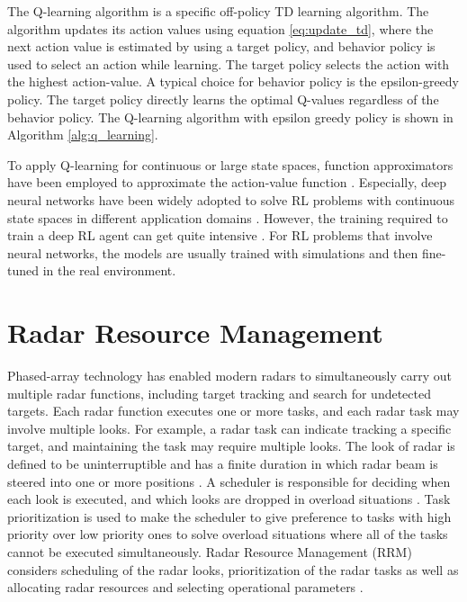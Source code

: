 \documentclass[english, 12pt, a4paper, elec, utf8, a-1b, online]{aaltothesis}
\begin{document}
The Q-learning algorithm is a specific off-policy TD learning algorithm. 
The algorithm updates its action values using equation \eqref{eq:update_td}, where the next action value is estimated by using a target policy, 
and behavior policy is used to select an action while learning. 
The target policy selects the action with the highest action-value.
A typical choice for behavior policy is the epsilon-greedy policy. 
The target policy directly learns the optimal Q-values regardless of the behavior policy. 
The Q-learning algorithm with epsilon greedy policy is shown in Algorithm \ref{alg:q_learning}.

To apply Q-learning for continuous or large state spaces, function approximators have been employed to approximate the action-value function \cite{Sutton2018}. 
Especially, deep neural networks have been widely adopted to solve RL problems with continuous state spaces in different application domains \cite{Mnih2013, Zhang2018, Luong2018}.
However, the training required to train a deep RL agent can get quite intensive \cite{Mnih2013}.
For RL problems that involve neural networks, the models are usually trained with simulations and then fine-tuned in the real environment.


\clearpage
\section{Radar Resource Management} \label{sec:existing_RRM}


Phased-array technology has enabled modern radars to simultaneously carry out multiple radar functions, including target tracking and search for undetected targets.
Each radar function executes one or more tasks, and each radar task may involve multiple looks.
For example, a radar task can indicate tracking a specific target, and maintaining the task may require multiple looks.
The look of radar is defined to be uninterruptible and has a finite duration in which radar beam is steered into one or more positions \cite{Moo2016}.
A scheduler is responsible for deciding when each look is executed, and which looks are dropped in overload situations \cite{Moo2016}. 
Task prioritization is used to make the scheduler to give preference to tasks with high priority over low priority ones to solve overload situations where all of the tasks cannot be executed simultaneously.
Radar Resource Management (RRM) considers scheduling of the radar looks, prioritization of the radar tasks as well as allocating radar resources and selecting operational parameters \cite{Moo2016}. 
\end{document}
